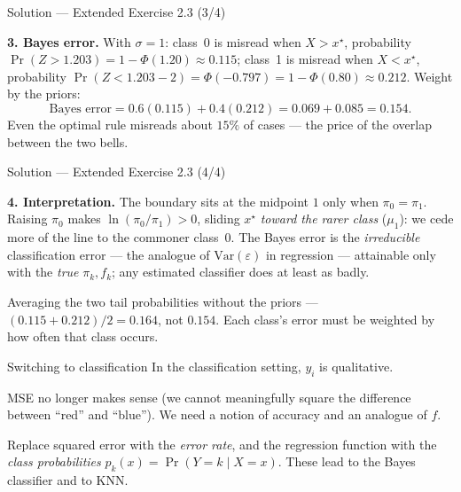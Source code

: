\documentclass[aspectratio=169,11pt]{beamer}
\begin{document}
\begin{frame}{Solution --- Extended Exercise 2.3 (3/4)}
\begin{solutionbox}
\textbf{3. Bayes error.} With $\sigma=1$: class~0 is misread when $X>x^\star$, probability $\Pr(Z>1.203)=1-\Phi(1.20)\approx0.115$; class~1 is misread when $X<x^\star$, probability $\Pr(Z<1.203-2)=\Phi(-0.797)=1-\Phi(0.80)\approx0.212$. Weight by the priors:
\[
\text{Bayes error}=0.6(0.115)+0.4(0.212)=0.069+0.085=\mathbf{0.154}.
\]
Even the optimal rule misreads about $15\%$ of cases --- the price of the overlap between the two bells.
\end{solutionbox}
\end{frame}

\begin{frame}{Solution --- Extended Exercise 2.3 (4/4)}
\begin{solutionbox}
\textbf{4. Interpretation.} The boundary sits at the midpoint $1$ only when $\pi_0=\pi_1$. Raising $\pi_0$ makes $\ln(\pi_0/\pi_1)>0$, sliding $x^\star$ \emph{toward the rarer class} ($\mu_1$): we cede more of the line to the commoner class~0. The Bayes error is the \emph{irreducible} classification error --- the analogue of $\mathrm{Var}(\varepsilon)$ in regression --- attainable only with the \emph{true} $\pi_k,f_k$; any estimated classifier does at least as badly.
\end{solutionbox}
\begin{mistake}
Averaging the two tail probabilities without the priors --- $(0.115+0.212)/2 = 0.164$, not $0.154$. Each class's error must be weighted by how often that class occurs.
\end{mistake}
\end{frame}


\begin{frame}{Switching to classification}
  In the classification setting, $y_i$ is qualitative.
  \begin{readme}
    MSE no longer makes sense (we cannot meaningfully square the
    difference between ``red'' and ``blue''). We need a notion of
    accuracy and an analogue of $f$.
  \end{readme}
  \begin{takeaway}
    Replace squared error with the \emph{error rate}, and the
    regression function with the \emph{class probabilities}
    $p_k(x)=\Pr(Y=k\mid X=x)$. These lead to the Bayes classifier and
    to KNN.
  \end{takeaway}
\end{frame}
\end{document}
